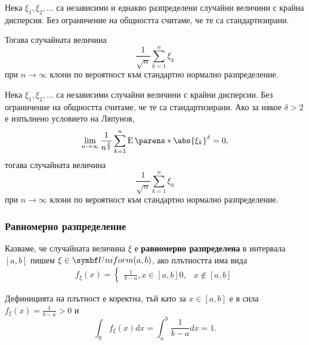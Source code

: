 \documentclass{../../common/topic}
\begin{document}
\begin{theorem}
  Нека \( \xi_1, \xi_2, \ldots \) са независими и еднакво разпределени случайни величини с крайна дисперсия. Без ограничение на общността считаме, че те са стандартизирани.

  Тогава случайната величина
  \begin{equation*}
    \frac 1 {\sqrt n} \sum_{k=1}^n \xi_k
  \end{equation*}
  при \( n \to \infty \) клони по вероятност към стандартно нормално разпределение.
\end{theorem}

\begin{theorem}
  Нека \( \xi_1, \xi_2, \ldots \) са независими случайни величини с крайни дисперсии. Без ограничение на общността считаме, че те са стандартизирани.
  Ако за някое \( \delta > 2 \) е изпълнено условието на Ляпунов,
  \begin{equation*}
    \lim_{n \to \infty} \frac 1 {n^{\frac \delta 2}} \sum_{k=1}^n \Expect \parens*{ {\abs{\xi_k}}^\delta } = 0,
  \end{equation*}
  тогава случайната величина
  \begin{equation*}
    \frac 1 {\sqrt n} \sum_{k=1}^n \xi_k
  \end{equation*}
  при \( n \to \infty \) клони по вероятност към стандартно нормално разпределение.
\end{theorem}

\subsubsection{Равномерно разпределение}\label{sec:unif}

\begin{definition}
  Казваме, че случайната величина \( \xi \) е \textbf{равномерно разпределена} в интервала \( [a, b] \) пишем \( \xi \in \distr{Uniform}(a, b) \), ако плътността има вида
  \begin{align*}
    f_\xi(x)
    =
    \begin{cases}
      \frac 1 {b-a}, x \in [a, b]
      0, & x \not\in [a, b]
    \end{cases}
  \end{align*}

  Дефиницията на плътност е коректна, тъй като за \( x \in [a, b] \) е в сила \( f_\xi(x) = \frac 1 {b-a} > 0 \) и
  \begin{equation*}
    \int_{\BbbR} f_\xi(x) dx
    =
    \int_a^b \frac 1 {b-a} dx
    =
    1.
  \end{equation*}
\end{definition}
\end{document}
